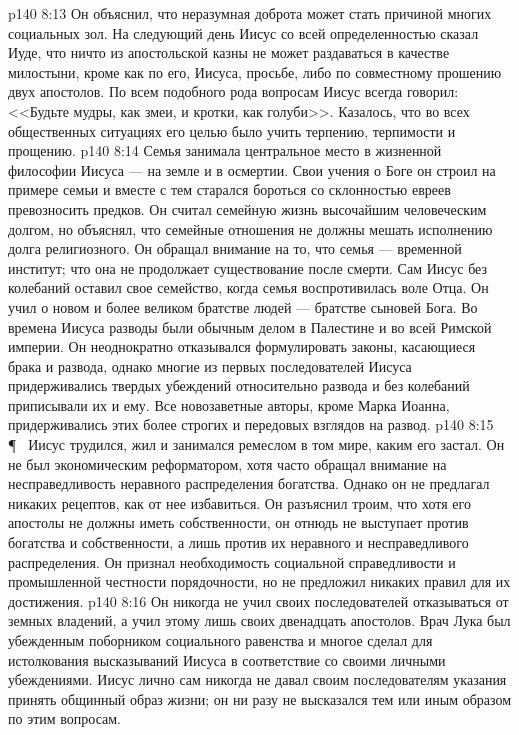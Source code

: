 \vs p140 8:13 Он объяснил, что неразумная доброта может стать причиной многих социальных зол. На следующий день Иисус со всей определенностью сказал Иуде, что ничто из апостольской казны не может раздаваться в качестве милостыни, кроме как по его, Иисуса, просьбе, либо по совместному прошению двух апостолов. По всем подобного рода вопросам Иисус всегда говорил: <<Будьте мудры, как змеи, и кротки, как голуби>>. Казалось, что во всех общественных ситуациях его целью было учить терпению, терпимости и прощению.
\vs p140 8:14 Семья занимала центральное место в жизненной философии Иисуса --- на земле и в осмертии. Свои учения о Боге он строил на примере семьи и вместе с тем старался бороться со склонностью евреев превозносить предков. Он считал семейную жизнь высочайшим человеческим долгом, но объяснял, что семейные отношения не должны мешать исполнению долга религиозного. Он обращал внимание на то, что семья --- временной институт; что она не продолжает существование после смерти. Сам Иисус без колебаний оставил свое семейство, когда семья воспротивилась воле Отца. Он учил о новом и более великом братстве людей --- братстве сыновей Бога. Во времена Иисуса разводы были обычным делом в Палестине и во всей Римской империи. Он неоднократно отказывался формулировать законы, касающиеся брака и развода, однако многие из первых последователей Иисуса придерживались твердых убеждений относительно развода и без колебаний приписывали их и ему. Все новозаветные авторы, кроме Марка Иоанна, придерживались этих более строгих и передовых взглядов на развод.
\vs p140 8:15 \P\ \bibnobreakspace {} Иисус трудился, жил и занимался ремеслом в том мире, каким его застал. Он не был экономическим реформатором, хотя часто обращал внимание на несправедливость неравного распределения богатства. Однако он не предлагал никаких рецептов, как от нее избавиться. Он разъяснил троим, что хотя его апостолы не должны иметь собственности, он отнюдь не выступает против богатства и собственности, а лишь против их неравного и несправедливого распределения. Он признал необходимость социальной справедливости и промышленной честности порядочности, но не предложил никаких правил для их достижения.
\vs p140 8:16 Он никогда не учил своих последователей отказываться от земных владений, а учил этому лишь своих двенадцать апостолов. Врач Лука был убежденным поборником социального равенства и многое сделал для истолкования высказываний Иисуса в соответствие со своими личными убеждениями. Иисус лично сам никогда не давал своим последователям указания принять общинный образ жизни; он ни разу не высказался тем или иным образом по этим вопросам.
